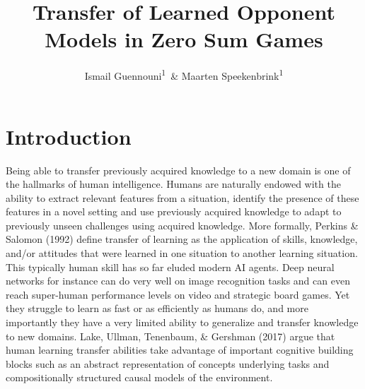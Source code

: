 \documentclass[man,floatsintext]{apa6}
\affiliation{
\vspace{0.5cm}
\textsuperscript{1} Department of Experimental Psychology, University College London}
\title{Transfer of Learned Opponent Models in Zero Sum Games}
\author{Ismail Guennouni\textsuperscript{1}~\& Maarten Speekenbrink\textsuperscript{1}}
\date{}
\begin{document}
\maketitle

\hypertarget{introduction}{%
\section{Introduction}\label{introduction}}

Being able to transfer previously acquired knowledge to a new domain is one of the hallmarks of human intelligence. Humans are naturally endowed with the ability to extract relevant features from a situation, identify the presence of these features in a novel setting and use previously acquired knowledge to adapt to previously unseen challenges using acquired knowledge. More formally, Perkins \& Salomon (1992) define transfer of learning as the application of skills, knowledge, and/or attitudes that were learned in one situation to another learning situation. This typically human skill has so far eluded modern AI agents. Deep neural networks for instance can do very well on image recognition tasks and can even reach super-human performance levels on video and strategic board games. Yet they struggle to learn as fast or as efficiently as humans do, and more importantly they have a very limited ability to generalize and transfer knowledge to new domains. Lake, Ullman, Tenenbaum, \& Gershman (2017) argue that human learning transfer abilities take advantage of important cognitive building blocks such as an abstract representation of concepts underlying tasks and compositionally structured causal models of the environment.
\end{document}
